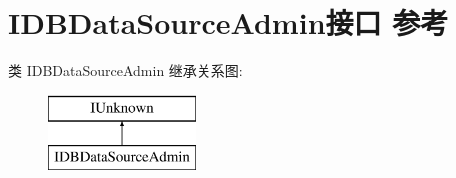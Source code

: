 \hypertarget{interface_i_d_b_data_source_admin}{}\section{I\+D\+B\+Data\+Source\+Admin接口 参考}
\label{interface_i_d_b_data_source_admin}
类 I\+D\+B\+Data\+Source\+Admin 继承关系图\+:\begin{figure}[H]
\begin{center}
\leavevmode
\includegraphics[height=2.000000cm]{interface_i_d_b_data_source_admin}
\end{center}
\end{figure}
